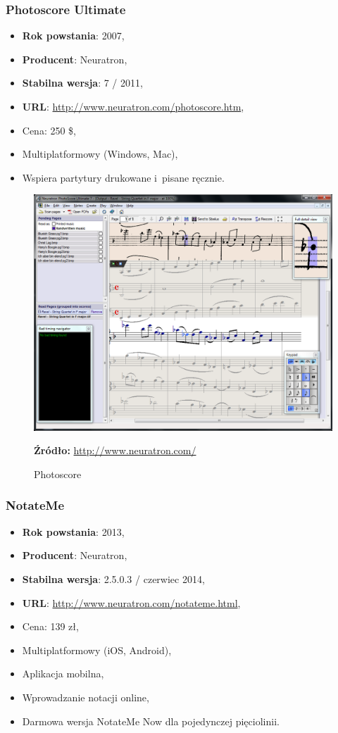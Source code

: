 \documentclass[polish,thesis,12pt]{dcsbook}
\newcommand{\source}[2]{
  	\caption*{\textbf{Źródło:} \href{#1}{{#2}}}
}
\begin{document}
\subsubsection{Photoscore Ultimate}
\begin{itemize}
  \item \textbf{Rok powstania}: 2007,
  \item \textbf{Producent}: Neuratron,
  \item \textbf{Stabilna wersja}: 7 / 2011,
  \item \textbf{URL}: \url{http://www.neuratron.com/photoscore.htm},
  \item Cena: 250 \$,
  \item Multiplatformowy (Windows, Mac),
  \item Wspiera partytury drukowane i~pisane ręcznie.
\end{itemize}

\begin{figure}[H]
  \centering
  \includegraphics[scale=0.35,bb=0 0 1064 842]{img/photoscore.png}
  \caption{Photoscore}
  \label{photoscore}
  \source{http://www.neuratron.com/photoscore.htm}{http://www.neuratron.com/}
\end{figure}

\subsubsection{NotateMe}
\begin{itemize}
  \item \textbf{Rok powstania}: 2013,
  \item \textbf{Producent}: Neuratron,
  \item \textbf{Stabilna wersja}: 2.5.0.3 / czerwiec 2014,
  \item \textbf{URL}: \url{http://www.neuratron.com/notateme.html},
  \item Cena: 139 zł,
  \item Multiplatformowy (iOS, Android),
  \item Aplikacja mobilna,
  \item Wprowadzanie notacji online,
  \item Darmowa wersja NotateMe Now dla pojedynczej pięciolinii.
\end{itemize}
\end{document}
